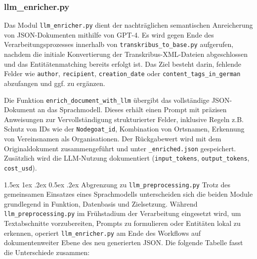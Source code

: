 \documentclass[12pt, a4paper, ngerman, bidi=default]{article}
\makeatletter
\newcommand{\code}[1]{\colorbox{VeryLightGray}{\texttt{#1}}} %
\let\oldparagraph\paragraph%
\renewcommand{\paragraph}{
    \@ifstar%
      \xxxParagraphStar%
      \xxxParagraphNoStar%
 }
\newcommand{\xxxParagraphStar}[1]{\oldparagraph*{#1}\mbox{}}
\newcommand{\xxxParagraphNoStar}[1]{\oldparagraph{#1}\mbox{}}
\renewcommand\paragraph{\@startsection{paragraph}{4}{0em}%
  {1.5ex \@plus1ex \@minus.2ex}%
  {0.5ex \@plus.2ex}%
  {\normalfont\normalsize\bfseries\itshape}}
\makeatother
\begin{document}
\subsubsection{llm\_enricher.py}\label{subsection:llm_enricher}

Das Modul \code{llm\_enricher.py} dient der nachträglichen semantischen Anreicherung von JSON-Dokumenten mithilfe von GPT-4. Es wird gegen Ende des Verarbeitungsprozesses innerhalb von \code{transkribus\_to\_base.py} aufgerufen, nachdem die initiale Konvertierung der Transkribus-XML-Dateien abgeschlossen und das Entitätenmatching bereits erfolgt ist. Das Ziel besteht darin, fehlende Felder wie \code{author}, \code{recipient}, \code{creation\_date} oder \code{content\_tags\_in\_german} abzufangen und ggf. zu ergänzen.

Die Funktion \code{enrich\_document\_with\_llm} übergibt das vollständige JSON-Dokument an das Sprachmodell. Dieses erhält einen Prompt mit präzisen Anweisungen zur Vervollständigung strukturierter Felder, inklusive Regeln z.B. Schutz von IDs wie der \code{Nodegoat\_id}, Kombination von Ortsnamen, Erkennung von Vereinsnamen als Organisationen. Der Rückgabewert wird mit dem Originaldokument zusammengeführt und unter \code{\_enriched.json} gespeichert. Zusätzlich wird die LLM-Nutzung dokumentiert (\code{input\_tokens}, \code{output\_tokens}, \code{cost\_usd}).

\paragraph{Abgrenzung zu \code{llm\_preprocessing.py}}%
Trotz des gemeinsamen Einsatzes eines Sprachmodells unterscheiden sich die beiden Module grundlegend in Funktion, Datenbasis und Zielsetzung. Während \code{llm\_preprocessing.py} im Frühstadium der Verarbeitung eingesetzt wird, um Textabschnitte vorzubereiten, Prompts zu formulieren oder Entitäten lokal zu erkennen, operiert \code{llm\_enricher.py} am Ende des Workflows auf dokumentenweiter Ebene des neu generierten JSON. Die folgende Tabelle fasst die Unterschiede zusammen:
\end{document}
